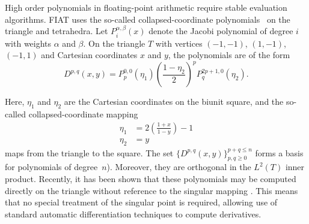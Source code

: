 High order polynomials in floating-point arithmetic require stable
evaluation algorithms.  FIAT uses the so-called collapsed-coordinate
polynomials~\citep{KarniadakisSherwin2005} on the triangle and tetrahedra.  Let
\(P^{\alpha,\beta}_i(x) \) denote the Jacobi polynomial of degree \( i
\) with weights \( \alpha \) and \( \beta \).  On the triangle \( T \)
with vertices \( (-1,-1) \), \((1,-1) \), \( (-1,1) \) and Cartesian
coordinates \( x\) and \( y \), the polynomials are of the form\vspace*{6pt}
\begin{equation}
D^{p,q}(x,y)=P^{0,0}_{p}(\eta_1)  \left( \frac{1-\eta_2}{2}
\right)^p P^{2p+1,0}_q(\eta_2).
\end{equation}

\pagebreak

\noindent Here, $\eta_1$ and $\eta_2$ are the Cartesian coordinates on
the biunit square, and the so-called collapsed-coordinate mapping
\[
\begin{split}
\eta_1 & = 2\left( \frac{1+x}{1-y} \right) - 1
\\
\eta_2 & = y
\end{split}
\]
maps from the triangle to the square.  The set $\{ D^{p,q}(x, y)
\}_{p,q \geqslant 0}^{p+q\leqslant n}$ forms a basis for polynomials
of degree~$n$).  Moreover, they are orthogonal in the $L^2(T)$ inner
product.  Recently, it has been shown that these polynomials may be
computed directly on the triangle without reference to the singular
mapping \citep{Kirby}.  This means that no special treatment of
the singular point is required, allowing use of standard automatic
differentiation techniques to compute derivatives.

